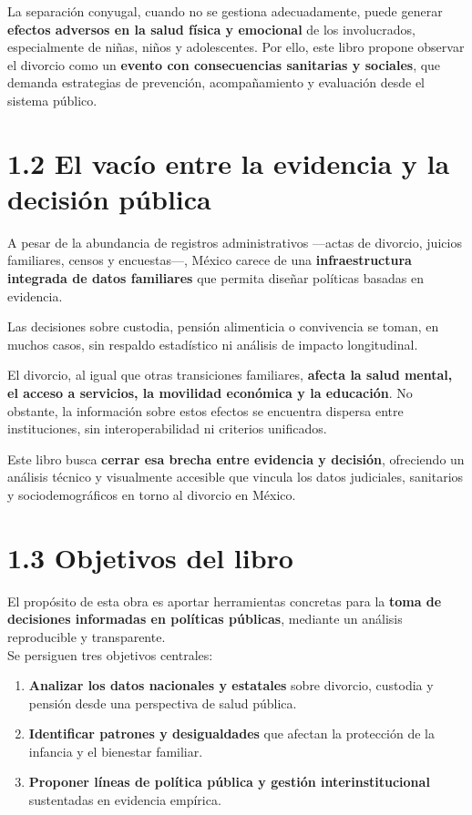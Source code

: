 \documentclass[
  letterpaper,
  DIV=11,
  numbers=noendperiod]{scrreprt}
\providecommand{\tightlist}{%
  \setlength{\itemsep}{0pt}\setlength{\parskip}{0pt}}
\begin{document}
La separación conyugal, cuando no se gestiona adecuadamente, puede
generar \textbf{efectos adversos en la salud física y emocional} de los
involucrados, especialmente de niñas, niños y adolescentes. Por ello,
este libro propone observar el divorcio como un \textbf{evento con
consecuencias sanitarias y sociales}, que demanda estrategias de
prevención, acompañamiento y evaluación desde el sistema público.


\chapter{1.2 El vacío entre la evidencia y la decisión
pública}\label{el-vacuxedo-entre-la-evidencia-y-la-decisiuxf3n-puxfablica}

A pesar de la abundancia de registros administrativos ---actas de
divorcio, juicios familiares, censos y encuestas---, México carece de
una \textbf{infraestructura integrada de datos familiares} que permita
diseñar políticas basadas en evidencia.

\hfill\break
Las decisiones sobre custodia, pensión alimenticia o convivencia se
toman, en muchos casos, sin respaldo estadístico ni análisis de impacto
longitudinal.

El divorcio, al igual que otras transiciones familiares, \textbf{afecta
la salud mental, el acceso a servicios, la movilidad económica y la
educación}. No obstante, la información sobre estos efectos se encuentra
dispersa entre instituciones, sin interoperabilidad ni criterios
unificados.

Este libro busca \textbf{cerrar esa brecha entre evidencia y decisión},
ofreciendo un análisis técnico y visualmente accesible que vincula los
datos judiciales, sanitarios y sociodemográficos en torno al divorcio en
México.


\chapter{1.3 Objetivos del libro}\label{objetivos-del-libro}

El propósito de esta obra es aportar herramientas concretas para la
\textbf{toma de decisiones informadas en políticas públicas}, mediante
un análisis reproducible y transparente.\\
Se persiguen tres objetivos centrales:

\begin{enumerate}
\def\labelenumi{\arabic{enumi}.}
\tightlist
\item
  \textbf{Analizar los datos nacionales y estatales} sobre divorcio,
  custodia y pensión desde una perspectiva de salud pública.\\
\item
  \textbf{Identificar patrones y desigualdades} que afectan la
  protección de la infancia y el bienestar familiar.\\
\item
  \textbf{Proponer líneas de política pública y gestión
  interinstitucional} sustentadas en evidencia empírica.
\end{enumerate}
\end{document}
